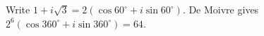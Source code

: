 Write $1+i\sqrt3=2(\cos60^\circ+i\sin60^\circ)$. De Moivre gives $2^6(\cos360^\circ+i\sin360^\circ)=\boxed{64}$.
